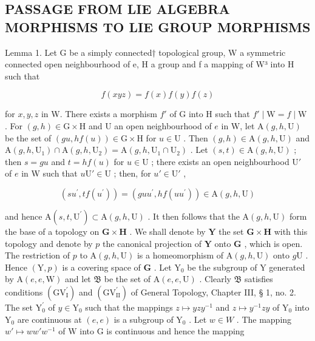 \subsection{PASSAGE FROM LIE ALGEBRA MORPHISMS TO LIE GROUP MORPHISMS}

Lemma 1. Let G be a simply connected† topological group, W a symmetric connected open neighbourhood of e, H a group and f a mapping of W³ into H such that

\[
f (x y z) = f (x) f (y) f (z)
\]

for \(x, y, z\) in W. There exists a morphism \(f'\) of G into H such that \(f' \mid \mathrm{W} = f \mid \mathrm{W}\) . For \((g, h) \in \mathrm{G} \times \mathrm{H}\) and U an open neighbourhood of \(e\) in W, let \(\mathrm{A}(g, h, \mathrm{U})\) be the set of \((gu, hf(u)) \in \mathrm{G} \times \mathrm{H}\) for \(u \in \mathrm{U}\) . Then \((g, h) \in \mathrm{A}(g, h, \mathrm{U})\) and \(\mathrm{A}(g, h, \mathrm{U}_1) \cap \mathrm{A}(g, h, \mathrm{U}_2) = \mathrm{A}(g, h, \mathrm{U}_1 \cap \mathrm{U}_2)\) . Let \((s, t) \in \mathrm{A}(g, h, \mathrm{U})\) ; then \(s = gu\) and \(t = hf(u)\) for \(u \in \mathrm{U}\) ; there exists an open neighbourhood \(\mathrm{U}'\) of \(e\) in W such that \(u\mathrm{U}' \in \mathrm{U}\) ; then, for \(u' \in \mathrm{U}'\) ,

\[
(s u ^ {\prime}, t f (u ^ {\prime})) = (g u u ^ {\prime}, h f (u u ^ {\prime})) \in \mathrm{A} (g, h, \mathrm{U})
\]

and hence \(\mathrm{A}(s,t,\mathrm{U}^{\prime})\subset \mathrm{A}(g,h,\mathrm{U})\) . It then follows that the \(\mathrm{A}(g,h,\mathrm{U})\) form the base of a topology on \(\mathbf{G}\times \mathbf{H}\) . We shall denote by \(\mathbf{Y}\) the set \(\mathbf{G}\times \mathbf{H}\) with this topology and denote by \(p\) the canonical projection of \(\mathbf{Y}\) onto \(\mathbf{G}\) , which is open. The restriction of \(p\) to \(\mathrm{A}(g,h,\mathrm{U})\) is a homeomorphism of \(\mathrm{A}(g,h,\mathrm{U})\) onto \(g\mathrm{U}\) . Hence \((\mathrm{Y},p)\) is a covering space of \(\mathbf{G}\) . Let \(\mathrm{Y}_0\) be the subgroup of \(\mathrm{Y}\) generated by \(\mathrm{A}(e,e,\mathrm{W})\) and let \(\mathfrak{B}\) be the set of \(\mathrm{A}(e,e,\mathrm{U})\) . Clearly \(\mathfrak{B}\) satisfies conditions \((\mathrm{GV}_{\mathrm{I}}^{\prime})\) and \((\mathrm{GV}_{\mathrm{II}}^{\prime})\) of General Topology, Chapter III, § 1, no. 2. The set \(\mathrm{Y}_0^{\prime}\) of \(y\in \mathrm{Y}_0\) such that the mappings \(z\mapsto yzy^{-1}\) and \(z\mapsto y^{-1}zy\) of \(\mathrm{Y}_0\) into \(\mathrm{Y}_0\) are continuous at \((e,e)\) is a subgroup of \(\mathrm{Y}_0\) . Let \(w\in W\) . The mapping \(w'\mapsto ww'w^{-1}\) of \(\mathrm{W}\) into \(\mathrm{G}\) is continuous and hence the mapping

